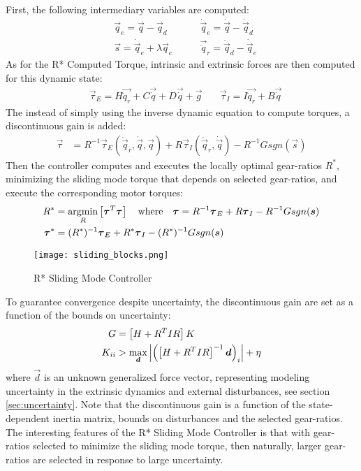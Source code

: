 First, the following intermediary variables are computed:
%
\begin{align}
	&\vec{q}_e        = \vec{q}          -  \vec{q}_d   \quad\quad
	&\dot{\vec{q}}_e  = \dot{\vec{q}}    -  \dot{\vec{q}}_d \\
	&\vec{s}          = \dot{\vec{q}}_e  +  \lambda \vec{q}_e \quad\quad
  &\vec{\ddot{q}}_r = \ddot{\vec{q}}_d -  \dot{\vec{q}}_e 
 \label{eq:slidingvar}
\end{align}
%
As for the R* Computed Torque, intrinsic and extrinsic forces are then computed for this dynamic state:
%
\begin{align}
	&\vec{\tau}_{E} = H \vec{ \ddot{q}_r } + C\vec{ \dot{q} } + D \vec{ \dot{q} } + \vec{ g } \quad
	&\vec{\tau}_{I} = I \vec{ \ddot{q}_r } + B \vec{ \dot{q} } 
\end{align}
%
The instead of simply using the inverse dynamic equation to compute torques, a discontinuous gain is added:
%
\begin{align}
	\vec{\tau} &=  R^{-1} 
	\vec{\tau}_{E}(\ddot{\vec{q}}_r,\dot{\vec{q}},\vec{q}) 
	+ R 
	\vec{\tau}_{I}(\ddot{\vec{q}}_r,\dot{\vec{q}})
  - R^{-1} G sgn( \vec{s} ) 
 \label{eq:slidingctl}
\end{align}
%
Then the controller computes and executes the locally optimal gear-ratios $R^*$, minimizing the sliding mode torque that depends on selected gear-ratios, and execute the corresponding motor torques: 
%
\begin{align}
R^{*} &= \operatornamewithlimits{argmin}\limits_{R} \left[ \vec{\tau}^T\vec{\tau}  \right] \quad\text{where}\quad \vec{\tau} = R^{-1} \vec{\tau}_{E} + R \vec{\tau}_{I} - R^{-1} G sgn( \vec{s} ) 
\\
\vec{\tau}^* &= (R^*)^{-1} \vec{\tau}_{E} + R^* \vec{\tau}_{I} - (R^*)^{-1} G sgn( \vec{s} ) 
\end{align} 
%
\begin{figure}[t]
	\centering
		\texttt{[image: sliding\_blocks.png]}
	\caption{R* Sliding Mode Controller}
	\label{fig:sliding_blocks}
\end{figure}
%
To guarantee convergence despite uncertainty, the discontinuous gain are set as a function of the bounds on uncertainty:
%
\begin{align}
	G &= \left[ H + R^T I R \right] K \\ K_{ii} &> \operatornamewithlimits{max}\limits_{\vec{d}} \left| \left(  \left[ H + R^T I R \right]^{-1} \vec{d} \right)_{i} \right| + \eta
\end{align}
%
where $\vec{d}$ is an unknown generalized force vector, representing modeling uncertainty in the extrinsic dynamics and external disturbances, see section \ref{sec:uncertainty}. Note that the discontinuous gain is a function of the state-dependent inertia matrix, bounds on disturbances and the selected gear-ratios. The interesting features of the R* Sliding Mode Controller is that with gear-ratios selected to minimize the sliding mode torque, then naturally, larger gear-ratios are selected in response to large uncertainty. 

